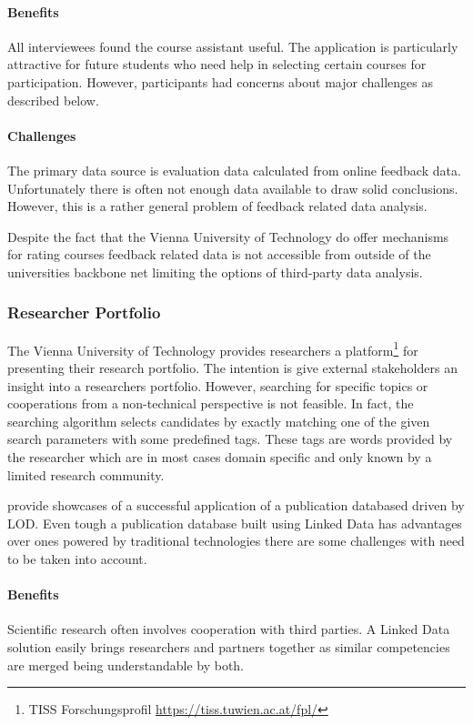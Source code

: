 \documentclass{article}
\begin{document}
\paragraph{Benefits}
All interviewees found the course assistant useful. The application is particularly attractive for future students who need help in selecting certain courses for participation. However, participants had concerns about major challenges as described below.  
\paragraph{Challenges}
The primary data source is evaluation data calculated from online feedback data. Unfortunately there is often not enough data available to draw solid conclusions. However, this is a rather general problem of feedback related data analysis. 

Despite the fact that the Vienna University of Technology do offer mechanisms for rating courses feedback related data is not accessible from outside of the universities backbone net limiting the options of third-party data analysis. 
\subsubsection{Researcher Portfolio}
The Vienna University of Technology provides researchers a platform\footnote{TISS Forschungsprofil \url{https://tiss.tuwien.ac.at/fpl/}} for presenting their research portfolio. The intention is give external stakeholders an insight into a researchers portfolio. However, searching for specific topics or cooperations from a non-technical perspective is not feasible. In fact, the searching algorithm selects candidates by exactly matching one of the given search parameters with some predefined tags. These tags are words provided by the researcher which are in most cases domain specific and only known by a limited research community. 

\citet{article:publication-database-linked-data} provide showcases of a successful application of a publication databased driven by LOD. Even tough a publication database built using Linked Data has advantages over ones powered by traditional technologies there are some challenges with need to be taken into account. 
\paragraph{Benefits}
Scientific research often involves cooperation with third parties. A Linked Data solution easily brings researchers and partners together as similar competencies are merged being understandable by both. 
\end{document}
